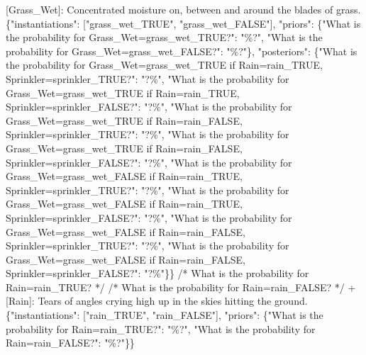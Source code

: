 \documentclass[
  11pt,
  letterpaper,
  openany]{book}
\newenvironment{Shaded}{\begin{snugshade}}{\end{snugshade}}
\newcommand{\DataTypeTok}[1]{\textcolor[rgb]{0.68,0.00,0.00}{#1}}
\newcommand{\ErrorTok}[1]{\textcolor[rgb]{0.68,0.00,0.00}{#1}}
\newcommand{\FunctionTok}[1]{\textcolor[rgb]{0.28,0.35,0.67}{#1}}
\newcommand{\OtherTok}[1]{\textcolor[rgb]{0.00,0.23,0.31}{#1}}
\newcommand{\StringTok}[1]{\textcolor[rgb]{0.13,0.47,0.30}{#1}}
\begin{document}
\begin{landscape}
\begin{Shaded}
\begin{Highlighting}[]
    \OtherTok{[}\ErrorTok{Grass\_Wet}\OtherTok{]}\ErrorTok{:} \ErrorTok{Concentrated} \ErrorTok{moisture} \ErrorTok{on,} \ErrorTok{between} \ErrorTok{and} \ErrorTok{around} \ErrorTok{the} \ErrorTok{blades} \ErrorTok{of} \ErrorTok{grass.} \FunctionTok{\{}\DataTypeTok{"instantiations"}\FunctionTok{:} \OtherTok{[}\StringTok{"grass\_wet\_TRUE"}\OtherTok{,} \StringTok{"grass\_wet\_FALSE"}\OtherTok{]}\FunctionTok{,} \DataTypeTok{"priors"}\FunctionTok{:} \FunctionTok{\{}\DataTypeTok{"What is the probability for Grass\_Wet=grass\_wet\_TRUE?"}\FunctionTok{:} \StringTok{"\%?"}\FunctionTok{,} \DataTypeTok{"What is the probability for Grass\_Wet=grass\_wet\_FALSE?"}\FunctionTok{:} \StringTok{"\%?"}\FunctionTok{\},} \DataTypeTok{"posteriors"}\FunctionTok{:} \FunctionTok{\{}\DataTypeTok{"What is the probability for Grass\_Wet=grass\_wet\_TRUE if Rain=rain\_TRUE, Sprinkler=sprinkler\_TRUE?"}\FunctionTok{:} \StringTok{"?\%"}\FunctionTok{,} \DataTypeTok{"What is the probability for Grass\_Wet=grass\_wet\_TRUE if Rain=rain\_TRUE, Sprinkler=sprinkler\_FALSE?"}\FunctionTok{:} \StringTok{"?\%"}\FunctionTok{,} \DataTypeTok{"What is the probability for Grass\_Wet=grass\_wet\_TRUE if Rain=rain\_FALSE, Sprinkler=sprinkler\_TRUE?"}\FunctionTok{:} \StringTok{"?\%"}\FunctionTok{,} \DataTypeTok{"What is the probability for Grass\_Wet=grass\_wet\_TRUE if Rain=rain\_FALSE, Sprinkler=sprinkler\_FALSE?"}\FunctionTok{:} \StringTok{"?\%"}\FunctionTok{,} \DataTypeTok{"What is the probability for Grass\_Wet=grass\_wet\_FALSE if Rain=rain\_TRUE, Sprinkler=sprinkler\_TRUE?"}\FunctionTok{:} \StringTok{"?\%"}\FunctionTok{,} \DataTypeTok{"What is the probability for Grass\_Wet=grass\_wet\_FALSE if Rain=rain\_TRUE, Sprinkler=sprinkler\_FALSE?"}\FunctionTok{:} \StringTok{"?\%"}\FunctionTok{,} \DataTypeTok{"What is the probability for Grass\_Wet=grass\_wet\_FALSE if Rain=rain\_FALSE, Sprinkler=sprinkler\_TRUE?"}\FunctionTok{:} \StringTok{"?\%"}\FunctionTok{,} \DataTypeTok{"What is the probability for Grass\_Wet=grass\_wet\_FALSE if Rain=rain\_FALSE, Sprinkler=sprinkler\_FALSE?"}\FunctionTok{:} \StringTok{"?\%"}\FunctionTok{\}\}}
        \ErrorTok{/*} \ErrorTok{What} \ErrorTok{is} \ErrorTok{the} \ErrorTok{probability} \ErrorTok{for} \ErrorTok{Rain=rain\_TRUE?} \ErrorTok{*/}
        \ErrorTok{/*} \ErrorTok{What} \ErrorTok{is} \ErrorTok{the} \ErrorTok{probability} \ErrorTok{for} \ErrorTok{Rain=rain\_FALSE?} \ErrorTok{*/}
        \ErrorTok{+} \OtherTok{[}\ErrorTok{Rain}\OtherTok{]}\ErrorTok{:} \ErrorTok{Tears} \ErrorTok{of} \ErrorTok{angles} \ErrorTok{crying} \ErrorTok{high} \ErrorTok{up} \ErrorTok{in} \ErrorTok{the} \ErrorTok{skies} \ErrorTok{hitting} \ErrorTok{the} \ErrorTok{ground.} \FunctionTok{\{}\DataTypeTok{"instantiations"}\FunctionTok{:} \OtherTok{[}\StringTok{"rain\_TRUE"}\OtherTok{,} \StringTok{"rain\_FALSE"}\OtherTok{]}\FunctionTok{,} \DataTypeTok{"priors"}\FunctionTok{:} \FunctionTok{\{}\DataTypeTok{"What is the probability for Rain=rain\_TRUE?"}\FunctionTok{:} \StringTok{"\%?"}\FunctionTok{,} \DataTypeTok{"What is the probability for Rain=rain\_FALSE?"}\FunctionTok{:} \StringTok{"\%?"}\FunctionTok{\}\}}

\end{Highlighting}
\end{Shaded}
\end{landscape}
\end{document}
